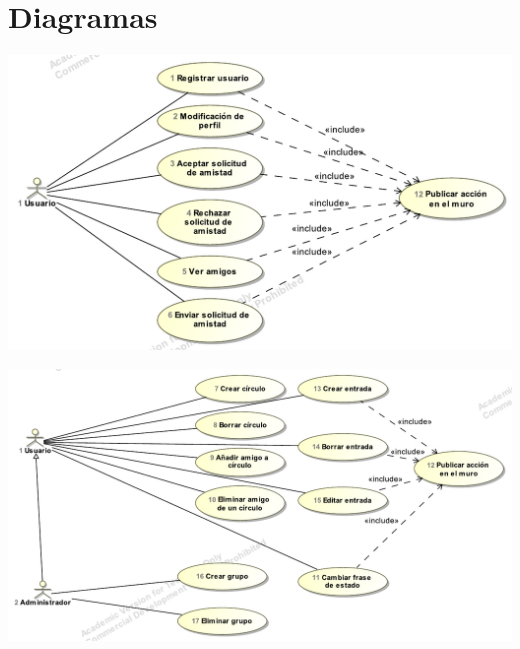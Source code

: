 \documentclass[12pt, a4paper, titlepage]{article}
\begin{document}
\section{Diagramas}
\begin{center}

\vspace{1cm}
\includegraphics[width=\textwidth]{Imagenes/casosUso1}
\end{center}

\vspace{2cm}

\begin{center}
\includegraphics[width=\textwidth]{Imagenes/casosUso2}
\end{center}
\end{document}
